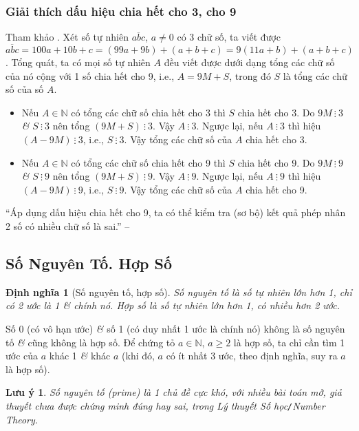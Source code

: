 \documentclass{article}
\numberwithin{equation}{section}
\newtheorem{definition}{Định nghĩa}[section]
\newtheorem{remark}{Lưu ý}[section]
\begin{document}
\subsubsection{Giải thích dấu hiệu chia hết cho 3, cho 9}
Tham khảo \cite[p. 40]{Thai_Anh_Dat_Ha_Loan_Nam_Quang_Toan_6_tap_1}. Xét số tự nhiên $\overline{abc}$, $a\ne 0$ có 3 chữ số, ta viết được $\overline{abc} = 100a + 10b + c = (99a + 9b) + (a + b + c) = 9(11a + b) + (a + b + c)$. Tổng quát, ta có mọi số tự nhiên $A$ đều viết được dưới dạng tổng các chữ số của nó cộng với 1 số chia hết cho 9, i.e., $A = 9M + S$, trong đó $S$ là tổng các chữ số của số $A$.
\begin{itemize}
	\item Nếu $A\in\mathbb{N}$ có tổng các chữ số chia hết cho 3 thì $S$ chia hết cho 3. Do $9M\ \vdots\ 3$ \textit{\&} $S\ \vdots\ 3$ nên tổng $(9M + S)\ \vdots\ 3$. Vậy $A\ \vdots\ 3$. Ngược lại, nếu $A\ \vdots\ 3$ thì hiệu $(A - 9M)\ \vdots\ 3$, i.e., $S\ \vdots\ 3$. Vậy tổng các chữ số của $A$ chia hết cho 3.
	\item Nếu $A\in\mathbb{N}$ có tổng các chữ số chia hết cho 9 thì $S$ chia hết cho 9. Do $9M\ \vdots\ 9$ \textit{\&} $S\ \vdots\ 9$ nên tổng $(9M + S)\ \vdots\ 9$. Vậy $A\ \vdots\ 9$. Ngược lại, nếu $A\ \vdots\ 9$  thì hiệu $(A - 9M)\ \vdots\ 9$, i.e., $S\ \vdots\ 9$. Vậy tổng các chữ số của $A$ chia hết cho 9.
\end{itemize}
``Áp dụng dấu hiệu chia hết cho 9, ta có thể kiểm tra (sơ bộ) kết quả phép nhân 2 số có nhiều chữ số là sai.'' -- \cite[p. 40]{Thai_Anh_Dat_Ha_Loan_Nam_Quang_Toan_6_tap_1}

\subsection{Số Nguyên Tố. Hợp Số}

\begin{definition}[Số nguyên tố, hợp số]
	\emph{Số nguyên tố} là số tự nhiên lớn hơn 1, chỉ có 2 ước là 1 \textit{\&} chính nó. \emph{Hợp số} là số tự nhiên lớn hơn 1, có nhiều hơn 2 ước.
\end{definition}
Số 0 (có vô hạn ước) \textit{\&} số 1 (có duy nhất 1 ước là chính nó) không là số nguyên tố \textit{\&} cũng không là hợp số. Để chứng tỏ $a\in\mathbb{N}$, $a\ge 2$ là hợp số, ta chỉ cần tìm 1 ước của $a$ khác 1 \textit{\&} khác $a$ (khi đó, $a$ có ít nhất 3 ước, theo định nghĩa, suy ra $a$ là hợp số).

\begin{remark}
	Số nguyên tố (prime) là 1 chủ đề cực khó, với nhiều bài toán mở, giả thuyết chưa được chứng minh đúng hay sai, trong Lý thuyết Số học\emph{\texttt{/}}Number Theory.
\end{remark}
\end{document}
